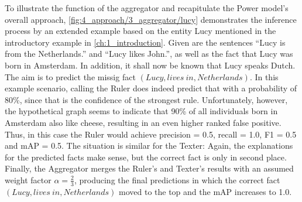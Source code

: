 To illustrate the function of the aggregator and recapitulate the Power model's overall approach, \autoref{fig:4_approach/3_aggregator/lucy} demonstrates the inference process by an extended example based on the entity Lucy mentioned in the introductory example in \autoref{ch:1_introduction}. Given are the sentences ``Lucy is from the Netherlands.'' and ``Lucy likes John.'', as well as the fact that Lucy was born in Amsterdam. In addition, it shall now be known that Lucy speaks Dutch. The aim is to predict the missig fact $(Lucy, lives~in, Netherlands)$. In this example scenario, calling the Ruler does indeed predict that with a probability of 80\%, since that is the confidence of the strongest rule. Unfortunately, however, the hypothetical graph seems to indicate that 90\% of all individuals born in Amsterdam also like cheese, resulting in an even higher ranked false positive. Thus, in this case the Ruler would achieve precision = 0.5, recall = 1.0, F1 = 0.5 and mAP = 0.5. The situation is similar for the Texter: Again, the explanations for the predicted facts make sense, but the correct fact is only in second place. Finally, the Aggregator merges the Ruler's and Texter's results with an assumed weight factor $\alpha = \frac{2}{3}$, producing the final predictions in which the correct fact $(Lucy, lives~in, Netherlands)$ moved to the top and the mAP increases to 1.0.
